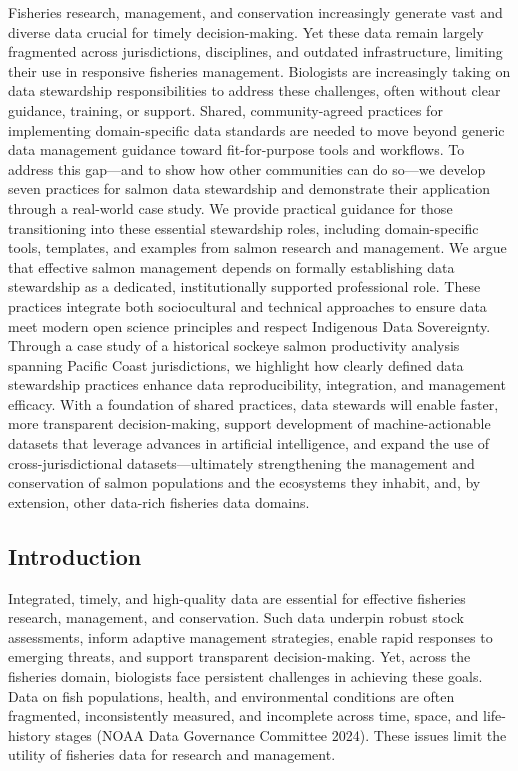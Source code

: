 \documentclass[
  letterpaper,
  DIV=11,
  numbers=noendperiod]{scrartcl}
\begin{document}
Fisheries research, management, and conservation increasingly generate
vast and diverse data crucial for timely decision-making. Yet these data
remain largely fragmented across jurisdictions, disciplines, and
outdated infrastructure, limiting their use in responsive fisheries
management. Biologists are increasingly taking on data stewardship
responsibilities to address these challenges, often without clear
guidance, training, or support. Shared, community-agreed practices for
implementing domain-specific data standards are needed to move beyond
generic data management guidance toward fit-for-purpose tools and
workflows. To address this gap---and to show how other communities can
do so---we develop seven practices for salmon data stewardship and
demonstrate their application through a real-world case study. We
provide practical guidance for those transitioning into these essential
stewardship roles, including domain-specific tools, templates, and
examples from salmon research and management. We argue that effective
salmon management depends on formally establishing data stewardship as a
dedicated, institutionally supported professional role. These practices
integrate both sociocultural and technical approaches to ensure data
meet modern open science principles and respect Indigenous Data
Sovereignty. Through a case study of a historical sockeye salmon
productivity analysis spanning Pacific Coast jurisdictions, we highlight
how clearly defined data stewardship practices enhance data
reproducibility, integration, and management efficacy. With a foundation
of shared practices, data stewards will enable faster, more transparent
decision-making, support development of machine-actionable datasets that
leverage advances in artificial intelligence, and expand the use of
cross-jurisdictional datasets---ultimately strengthening the management
and conservation of salmon populations and the ecosystems they inhabit,
and, by extension, other data-rich fisheries data domains.

\subsection{Introduction}\label{introduction}

Integrated, timely, and high-quality data are essential for effective
fisheries research, management, and conservation. Such data underpin
robust stock assessments, inform adaptive management strategies, enable
rapid responses to emerging threats, and support transparent
decision-making. Yet, across the fisheries domain, biologists face
persistent challenges in achieving these goals. Data on fish
populations, health, and environmental conditions are often fragmented,
inconsistently measured, and incomplete across time, space, and
life-history stages (NOAA Data Governance Committee 2024). These issues
limit the utility of fisheries data for research and management.
\end{document}
